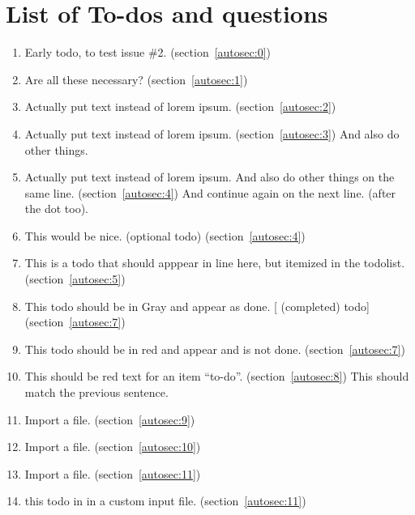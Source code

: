 \section{List of To-dos and questions}
    \begin{enumerate}[noitemsep]
        \item {\color{red}Early todo, to test issue \#2.} (section~\ref{autosec:0})
        \item {\color{ForestGreen}Are all these necessary?} (section~\ref{autosec:1})
        \item {\color{red}Actually put text instead of lorem ipsum.} (section~\ref{autosec:2})
        \item {\color{red}Actually put text instead of lorem ipsum.} (section~\ref{autosec:3})
{\color{red}And also do other things.}
        \item {\color{red}Actually put text instead of lorem ipsum. And also do other things on the same line.} (section~\ref{autosec:4})
{\color{red}And continue again on the next line. (after the dot too).}
        \item {\color{Orange}This would be nice. (optional todo)} (section~\ref{autosec:4})
        \item {\color{red}This is a todo that should apppear in line here, but itemized in the todolist.} (section~\ref{autosec:5})
        \item {\color{Gray}This todo should be in Gray and appear as done. [ (completed) todo]} (section~\ref{autosec:7})
        \item {\color{red}This todo should be in red and appear and is not done.} (section~\ref{autosec:7})
        \item {\color{red}This should be red text for an item ``to-do''.} (section~\ref{autosec:8})
{\color{red}This should match the previous sentence.}
        \item {\color{red}Import a file.} (section~\ref{autosec:9})
        \item {\color{red}Import a file.} (section~\ref{autosec:10})
        \item {\color{red}Import a file.} (section~\ref{autosec:11})
        \item {\color{red}this todo in in a custom input file.} (section~\ref{autosec:11})
    \end{enumerate}

